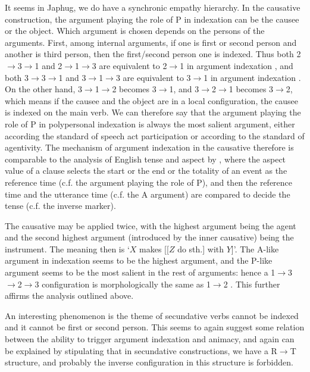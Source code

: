 \documentclass[a4paper, oneside, 12pt]{report}
\newcommand*{\textto}{$\to$}
\newcommand*{\citesec}[1]{\S~{#1}}
\newcommand*{\citepage}[1]{p.~{#1}}
\newcommand{\translate}[1]{`#1'}
\begin{document}
It seems in Japhug, we do have a synchronic empathy hierarchy.
In the causative construction, the argument playing the role of P in indexation
can be the causee or the object.
Which argument is chosen depends on the persons of the arguments.
First, among internal arguments,
if one is first or second person and another is third person,
then the first/second person one is indexed.
Thus both 2\textto 3\textto 1 and 2\textto 1\textto 3 
are equivalent to 2\textto 1 in argument indexation
\citep[\citepage{584}]{jacques2021grammar},
and both 3\textto 3\textto 1 and 3\textto 1\textto 3 
are equivalent to 3\textto 1 in argument indexation
\citep[\citepage{310}]{jacques2021grammar}.
On the other hand, 3\textto 1\textto 2 becomes 3\textto 1,
and 3\textto 2\textto 1 becomes 3\textto 2,
which means if the causee and the object are in a local configuration,
the causee is indexed on the main verb.
We can therefore say that the argument playing the role of P in polypersonal indexation
is always the most salient argument,
either according the standard of speech act participation or according to the standard of agentivity.
The mechanism of argument indexation in the causative
therefore is comparable to the analysis of English tense and aspect 
by \citet[\citesec{7.4.1}]{wiltschko2014universal},
where the aspect value of a clause selects the start or the end or the totality of an event
as the reference time (c.f. the argument playing the role of P),
and then the reference time and the utterance time (c.f. the A argument)
are compared to decide the tense (c.f. the inverse marker).

The causative may be applied twice,
with the highest argument being the agent
and the second highest argument (introduced by the inner causative) being the instrument.
The meaning then is \translate{$X$ makes [[$Z$ do sth.] with $Y$]}.
The A-like argument in indexation seems to be the highest argument,
and the P-like argument seems to be the most salient in the rest of arguments:
hence a 1\textto 3\textto 2\textto 3 configuration
is morphologically the same as 1\textto 2
\citep[\citepage{848}, (67)]{jacques2021grammar}.
This further affirms the analysis outlined above.

An interesting phenomenon is the theme of secundative verbs
cannot be indexed and it cannot be first or second person.
This seems to again suggest some relation between
the ability to trigger argument indexation and animacy,
and again can be explained by stipulating that in secundative constructions,
we have a R\textto T structure,
and probably the inverse configuration in this structure is forbidden. 
\end{document}
